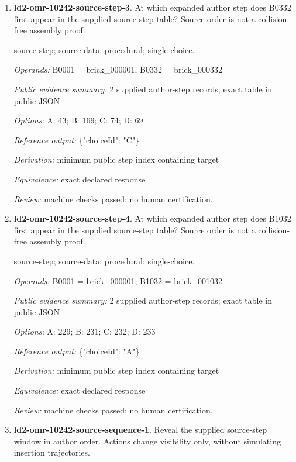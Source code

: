 \begin{enumerate}
\item \textbf{ld2-omr-10242-source-step-3}. At which expanded author step does B0332 first appear in the supplied source-step table? Source order is not a collision-free assembly proof.
\par{\small source-step; source-data; procedural; single-choice.\par\textit{Operands:} B0001 = brick\_000001, B0332 = brick\_000332\par\textit{Public evidence summary:} 2 supplied author-step records; exact table in public JSON\par\textit{Options:} A: 43; B: 169; C: 74; D: 69\par\textit{Reference output:} \{"choiceId": "C"\}\par\textit{Derivation:} minimum public step index containing target\par\textit{Equivalence:} exact declared response\par\textit{Review:} machine checks passed; no human certification.}
\item \textbf{ld2-omr-10242-source-step-4}. At which expanded author step does B1032 first appear in the supplied source-step table? Source order is not a collision-free assembly proof.
\par{\small source-step; source-data; procedural; single-choice.\par\textit{Operands:} B0001 = brick\_000001, B1032 = brick\_001032\par\textit{Public evidence summary:} 2 supplied author-step records; exact table in public JSON\par\textit{Options:} A: 229; B: 231; C: 232; D: 233\par\textit{Reference output:} \{"choiceId": "A"\}\par\textit{Derivation:} minimum public step index containing target\par\textit{Equivalence:} exact declared response\par\textit{Review:} machine checks passed; no human certification.}
\item \textbf{ld2-omr-10242-source-sequence-1}. Reveal the supplied source-step window in author order. Actions change visibility only, without simulating insertion trajectories.

\end{enumerate}
